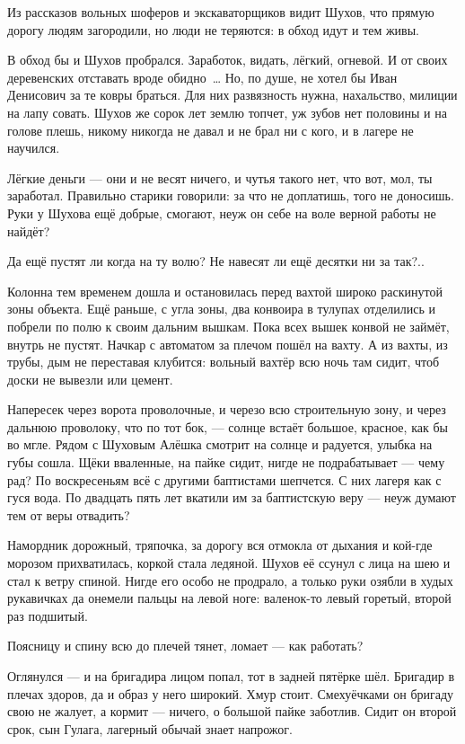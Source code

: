 Из рассказов вольных шоферов и экскаваторщиков видит Шухов, что прямую дорогу людям 
загородили, но люди не теряются: в обход идут и тем живы.

В обход бы и Шухов пробрался. Заработок, видать, лёгкий, огневой. И от своих деревенских 
отставать вроде обидно~\dots{} Но, по душе, не хотел бы Иван Денисович за те ковры браться. Для 
них развязность нужна, нахальство, милиции на лапу совать. Шухов же сорок лет землю топчет, 
уж зубов нет половины и на голове плешь, никому никогда не давал и не брал ни с кого, и в 
лагере не научился.

Лёгкие деньги --- они и не весят ничего, и чутья такого нет, что вот, мол, ты заработал. 
Правильно старики говорили: за что не доплатишь, того не доносишь. Руки у Шухова ещё добрые, 
смогают, неуж он себе на воле верной работы не найдёт?

Да ещё пустят ли когда на ту волю? Не навесят ли ещё десятки ни за так?..

Колонна тем временем дошла и остановилась перед вахтой широко раскинутой зоны объекта. Ещё 
раньше, с угла зоны, два конвоира в тулупах отделились и побрели по полю к своим дальним 
вышкам. Пока всех вышек конвой не займёт, внутрь не пустят. Начкар с автоматом за плечом 
пошёл на вахту. А из вахты, из трубы, дым не переставая клубится: вольный вахтёр всю ночь там 
сидит, чтоб доски не вывезли или цемент.

Напересек через ворота проволочные, и черезо всю строительную зону, и через дальнюю 
проволоку, что по тот бок, --- солнце встаёт большое, красное, как бы во мгле. Рядом с Шуховым 
Алёшка смотрит на солнце и радуется, улыбка на губы сошла. Щёки вваленные, на пайке сидит, 
нигде не подрабатывает --- чему рад? По воскресеньям всё с другими баптистами шепчется. С них 
лагеря как с гуся вода. По двадцать пять лет вкатили им за баптистскую веру --- неуж думают тем 
от веры отвадить?

Намордник дорожный, тряпочка, за дорогу вся отмокла от дыхания и кой-где морозом 
прихватилась, коркой стала ледяной. Шухов её ссунул с лица на шею и стал к ветру спиной. Нигде 
его особо не продрало, а только руки озябли в худых рукавичках да онемели пальцы на левой 
ноге: валенок-то левый горетый, второй раз подшитый.

Поясницу и спину всю до плечей тянет, ломает --- как работать?

Оглянулся --- и на бригадира лицом попал, тот в задней пятёрке шёл. Бригадир в плечах здоров, 
да и образ у него широкий. Хмур стоит. Смехуёчками он бригаду свою не жалует, а кормит --- 
ничего, о большой пайке заботлив. Сидит он второй срок, сын Гулага, лагерный обычай знает 
напрожог.

